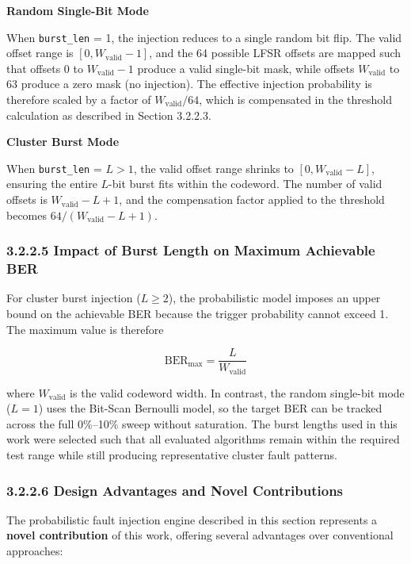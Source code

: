 \documentclass[
  12pt,
  a4paper]{report}
\begin{document}
\textbf{Random Single-Bit Mode}

When \texttt{burst\_len} = 1, the injection reduces to a single random
bit flip. The valid offset range is \([0, W_{\text{valid}} - 1]\), and
the 64 possible LFSR offsets are mapped such that offsets 0 to
\(W_{\text{valid}} - 1\) produce a valid single-bit mask, while offsets
\(W_{\text{valid}}\) to 63 produce a zero mask (no injection). The
effective injection probability is therefore scaled by a factor of
\(W_{\text{valid}} / 64\), which is compensated in the threshold
calculation as described in Section 3.2.2.3.

\textbf{Cluster Burst Mode}

When \texttt{burst\_len} = \(L > 1\), the valid offset range shrinks to
\([0, W_{\text{valid}} - L]\), ensuring the entire \(L\)-bit burst fits
within the codeword. The number of valid offsets is
\(W_{\text{valid}} - L + 1\), and the compensation factor applied to the
threshold becomes \(64 / (W_{\text{valid}} - L + 1)\).

\subsubsection{3.2.2.5 Impact of Burst Length on Maximum Achievable
BER}\label{impact-of-burst-length-on-maximum-achievable-ber}

For cluster burst injection (\(L \geq 2\)), the probabilistic model
imposes an upper bound on the achievable BER because the trigger
probability cannot exceed 1. The maximum value is therefore

\[\text{BER}_{\text{max}} = \frac{L}{W_{\text{valid}}}\]

where \(W_{\text{valid}}\) is the valid codeword width. In contrast, the
random single-bit mode (\(L=1\)) uses the Bit-Scan Bernoulli model, so
the target BER can be tracked across the full 0\%--10\% sweep without
saturation. The burst lengths used in this work were selected such that
all evaluated algorithms remain within the required test range while
still producing representative cluster fault patterns.

\subsubsection{3.2.2.6 Design Advantages and Novel
Contributions}\label{design-advantages-and-novel-contributions}

The probabilistic fault injection engine described in this section
represents a \textbf{novel contribution} of this work, offering several
advantages over conventional approaches:
\end{document}
